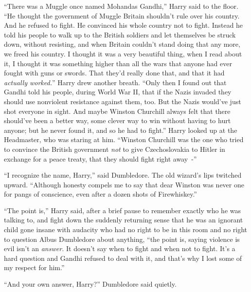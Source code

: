 ``There was a Muggle once named Mohandas Gandhi,'' Harry said to the floor. ``He thought the government of Muggle Britain shouldn't rule over his country. And he refused to fight. He convinced his whole country not to fight. Instead he told his people to walk up to the British soldiers and let themselves be struck down, without resisting, and when Britain couldn't stand doing that any more, we freed his country. I thought it was a very beautiful thing, when I read about it, I thought it was something higher than all the wars that anyone had ever fought with guns or swords. That they'd really done that, and that it had \emph{actually worked.}'' Harry drew another breath. ``Only then I found out that Gandhi told his people, during World War II, that if the Nazis invaded they should use nonviolent resistance against them, too. But the Nazis would've just shot everyone in sight. And maybe Winston Churchill always felt that there should've been a better way, some clever way to win without having to hurt anyone; but he never found it, and so he had to fight.'' Harry looked up at the Headmaster, who was staring at him. ``Winston Churchill was the one who tried to convince the British government \emph{not} to give Czechoslovakia to Hitler in exchange for a peace treaty, that they should fight right away~-''

``I recognize the name, Harry,'' said Dumbledore. The old wizard's lips twitched upward. ``Although honesty compels me to say that dear Winston was never one for pangs of conscience, even after a dozen shots of Firewhiskey.''

``The point is,'' Harry said, after a brief pause to remember exactly who he was talking to, and fight down the suddenly returning sense that he was an ignorant child gone insane with audacity who had no right to be in this room and no right to question Albus Dumbledore about anything, ``the point is, saying violence is evil isn't an \emph{answer.} It doesn't say when to fight and when not to fight. It's a hard question and Gandhi refused to deal with it, and that's why I lost some of my respect for him.''

``And your own answer, Harry?'' Dumbledore said quietly.

